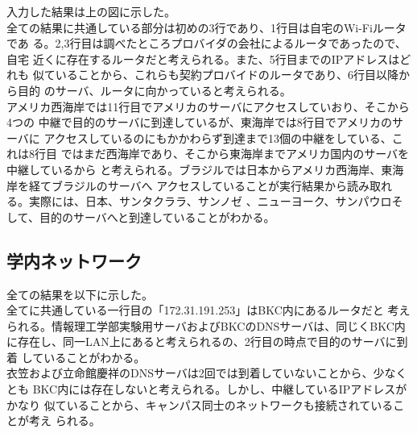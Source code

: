 \documentclass[dvipdfmx,autodetect-engine,titlepage]{jsarticle}
\begin{document}
入力した結果は上の図に示した。\\
全ての結果に共通している部分は初めの3行であり、1行目は自宅のWi-Fiルータであ
る。2,3行目は調べたところプロバイダの会社によるルータであったので、自宅
近くに存在するルータだと考えられる。また、5行目までのIPアドレスはどれも
似ていることから、これらも契約プロバイドのルータであり、6行目以降から目的
のサーバ、ルータに向かっていると考えられる。\\
アメリカ西海岸では11行目でアメリカのサーバにアクセスしていおり、そこから4つの
中継で目的のサーバに到達しているが、東海岸では8行目でアメリカのサーバに
アクセスしているのにもかかわらず到達まで13個の中継をしている、これは8行目
ではまだ西海岸であり、そこから東海岸までアメリカ国内のサーバを中継しているから
と考えられる。ブラジルでは日本からアメリカ西海岸、東海岸を経てブラジルのサーバへ
アクセスしていることが実行結果から読み取れる。実際には、日本、サンタクララ、サンノゼ
、ニューヨーク、サンパウロそして、目的のサーバへと到達していることがわかる。



\subsection{学内ネットワーク}
全ての結果を以下に示した。\\
全てに共通している一行目の「172.31.191.253」はBKC内にあるルータだと
考えられる。情報理工学部実験用サーバおよびBKCのDNSサーバは、同じくBKC内
に存在し、同一LAN上にあると考えられるの、2行目の時点で目的のサーバに到着
していることがわかる。\\
衣笠および立命館慶祥のDNSサーバは2回では到着していないことから、少なくとも
BKC内には存在しないと考えられる。しかし、中継しているIPアドレスがかなり
似ていることから、キャンパス同士のネットワークも接続されていることが考え
られる。
\end{document}
